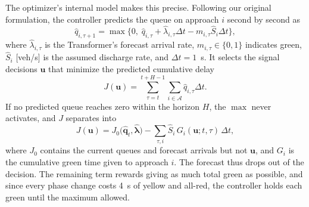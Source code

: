 \documentclass[letterpaper,12pt,conference]{ieeeconf}
\begin{document}
The optimizer's internal model makes this precise. Following our
original formulation, the controller predicts the queue on
approach $i$ second by second as
\begin{equation}
\hat q_{i,\tau+1}=\max\{0,\;\hat q_{i,\tau}+\hat\lambda_{i,\tau}\Delta t
-m_{i,\tau}\hat S_i\Delta t\},
\label{eq:fluid}
\end{equation}
where $\hat\lambda_{i,\tau}$ is the Transformer's forecast arrival
rate, $m_{i,\tau}\in\{0,1\}$ indicates green, $\hat S_i$ [veh/s] is
the assumed discharge rate, and $\Delta t=1$~s. It selects the
signal decisions $\mathbf u$ that minimize the predicted
cumulative delay
\begin{equation}
J(\mathbf u)=\sum_{\tau=t}^{t+H-1}\sum_{i\in\mathcal A}
\hat q_{i,\tau}\Delta t .
\label{eq:objective}
\end{equation}
If no predicted queue reaches zero within the horizon $H$, the
$\max$ never activates, and $J$ separates into
\begin{equation}
J(\mathbf u)=J_0\big(\hat{\mathbf q}_t,\hat{\bm\lambda}\big)
-\sum_{\tau,i}\hat S_i\,G_{i}(\mathbf u;t,\tau)\,\Delta t,
\label{eq:indep}
\end{equation}
where $J_0$ contains the current queues and forecast arrivals but
not $\mathbf u$, and $G_i$ is the cumulative green time given to
approach $i$. The forecast thus drops out of the decision. The
remaining term rewards giving as much total green as possible,
and since every phase change costs 4~s of yellow and all-red, the
controller holds each green until the maximum allowed. 
\end{document}
